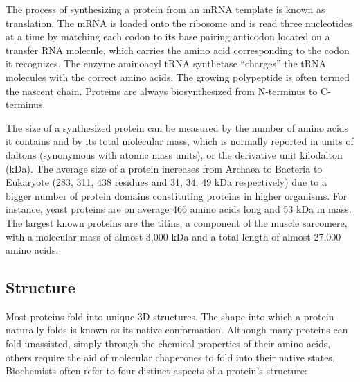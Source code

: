 The process of synthesizing a protein from an mRNA template is known as translation. The mRNA is loaded onto the ribosome and is read three nucleotides at a time by matching each codon to its base pairing anticodon located on a transfer RNA molecule, which carries the amino acid corresponding to the codon it recognizes. The enzyme aminoacyl tRNA synthetase ``charges'' the tRNA molecules with the correct amino acids. The growing polypeptide is often termed the nascent chain. Proteins are always biosynthesized from N-terminus to C-terminus.

The size of a synthesized protein can be measured by the number of amino acids it contains and by its total molecular mass, which is normally reported in units of daltons (synonymous with atomic mass units), or the derivative unit kilodalton (kDa). The average size of a protein increases from Archaea to Bacteria to Eukaryote (283, 311, 438 residues and 31, 34, 49 kDa respectively) due to a bigger number of protein domains constituting proteins in higher organisms. For instance, yeast proteins are on average 466 amino acids long and 53 kDa in mass. The largest known proteins are the titins, a component of the muscle sarcomere, with a molecular mass of almost 3,000 kDa and a total length of almost 27,000 amino acids.

\hypertarget{structure}{%
\subsection{Structure}\label{structure}}

Most proteins fold into unique 3D structures. The shape into which a protein naturally folds is known as its native conformation. Although many proteins can fold unassisted, simply through the chemical properties of their amino acids, others require the aid of molecular chaperones to fold into their native states. Biochemists often refer to four distinct aspects of a protein's structure:

